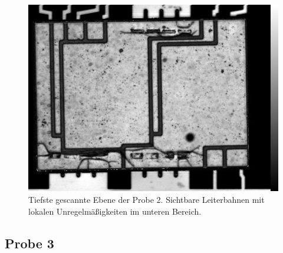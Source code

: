 \begin{figure}[htbp]
    \centering
    \includegraphics[scale=0.30]{Bilder/Probe2_i794_x005.jpg}
    \caption{Tiefste gescannte Ebene der Probe 2. Sichtbare Leiterbahnen mit lokalen Unregelmäßigkeiten im unteren Bereich.}
    \label{Abbildung 9:probe2_5}
\end{figure}


\subsection{Probe 3}

